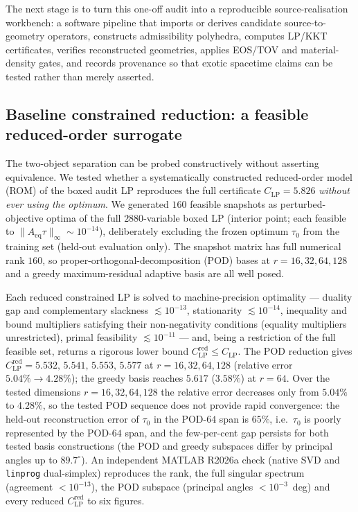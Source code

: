 \documentclass[11pt,a4paper]{article}
\begin{document}
The next stage is to turn this one-off audit into a reproducible source-realisation workbench: a software pipeline that imports or derives candidate source-to-geometry operators, constructs admissibility polyhedra, computes LP/KKT certificates, verifies reconstructed geometries, applies EOS/TOV and material-density gates, and records provenance so that exotic spacetime claims can be tested rather than merely asserted.

\subsection{Baseline constrained reduction: a feasible reduced-order surrogate}\label{sec:baseline-reduction}
The two-object separation can be probed constructively without asserting equivalence. We tested whether a systematically constructed reduced-order model (ROM) of the boxed audit LP reproduces the full certificate $C_{\mathrm{LP}}=5.826$ \emph{without ever using the optimum}. We generated $160$ feasible snapshots as perturbed-objective optima of the full $2880$-variable boxed LP (interior point; each feasible to $\lVert A_{\mathrm{eq}}\tau\rVert_{\infty}\sim10^{-14}$), deliberately excluding the frozen optimum $\tau_{0}$ from the training set (held-out evaluation only). The snapshot matrix has full numerical rank $160$, so proper-orthogonal-decomposition (POD) bases at $r=16,32,64,128$ and a greedy maximum-residual adaptive basis are all well posed.

Each reduced constrained LP is solved to machine-precision optimality --- duality gap and complementary slackness $\lesssim10^{-13}$, stationarity $\lesssim10^{-14}$, inequality and bound multipliers satisfying their non-negativity conditions (equality multipliers unrestricted), primal feasibility $\lesssim10^{-11}$ --- and, being a restriction of the full feasible set, returns a rigorous lower bound $C_{\mathrm{LP}}^{\mathrm{red}}\le C_{\mathrm{LP}}$. The POD reduction gives $C_{\mathrm{LP}}^{\mathrm{red}}=5.532,\,5.541,\,5.553,\,5.577$ at $r=16,32,64,128$ (relative error $5.04\%\rightarrow4.28\%$); the greedy basis reaches $5.617$ ($3.58\%$) at $r=64$. Over the tested dimensions $r=16,32,64,128$ the relative error decreases only from $5.04\%$ to $4.28\%$, so the tested POD sequence does not provide rapid convergence: the held-out reconstruction error of $\tau_{0}$ in the POD-$64$ span is $65\%$, i.e.\ $\tau_{0}$ is poorly represented by the POD-$64$ span, and the few-per-cent gap persists for both tested basis constructions (the POD and greedy subspaces differ by principal angles up to $89.7^{\circ}$). An independent MATLAB R2026a check (native SVD and \texttt{linprog} dual-simplex) reproduces the rank, the full singular spectrum (agreement $<10^{-13}$), the POD subspace (principal angles $<10^{-3}$~deg) and every reduced $C_{\mathrm{LP}}^{\mathrm{red}}$ to six figures.
\end{document}
